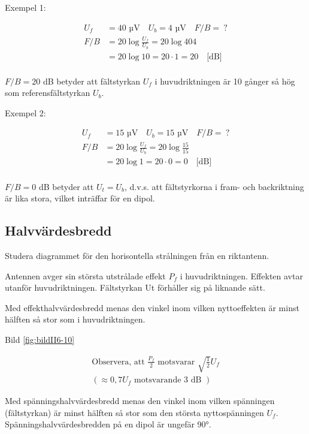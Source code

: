 Exempel 1:

\begin{align*}
  U_f &= 40 \text{ µV} \quad U_b = 4\text{ µV} \quad F/B =\ ? \\
  F/B &= 20 \log\frac{U_f}{U_b} = 20 \log{40}{4} \\
  &= 20 \log 10 = 20 \cdot 1 = 20 \quad \text{[dB]} \\
\end{align*}

\(F/B = 20\) dB betyder att fältstyrkan \(U_f\) i huvudriktningen är
10 gånger så hög som referensfältstyrkan \(U_b\).

Exempel 2:

\begin{align*}
  U_f &= 15 \text{ µV} \quad U_b = 15\text{ µV} \quad F/B =\ ? \\
  F/B &= 20 \log\frac{U_f}{U_b} = 20 \log\frac{15}{15} \\
  &= 20 \log 1 = 20 \cdot 0 = 0 \quad \text{[dB]} \\
\end{align*}

\(F/B = 0\) dB betyder att \(U_t = U_b\), d.v.s. att fältstyrkorna i
fram- och backriktning är lika stora, vilket inträffar för en dipol.

\subsection{Halvvärdesbredd}

Studera diagrammet för den horisontella strålningen från en
riktantenn.

Antennen avger sin största utstrålade effekt \(P_f\) i
huvudriktningen.  Effekten avtar utanför huvudriktningen.  Fältstyrkan
Ut förhåller sig på liknande sätt.

Med effekthalvvärdesbredd menas den vinkel inom vilken nyttoeffekten
är minst hälften så stor som i huvudriktningen.

Bild \ref{fig:bildII6-10}

\begin{gather*}
  \text{Observera, att } \frac{P_f}{2} \text{ motsvarar }
  \sqrt{\frac{1}{2}}U_f \\
  ( \approx 0,7 U_f \text{ motsvarande 3 dB })
\end{gather*}

Med spänningshalvvärdesbredd menas den vinkel inom vilken spänningen
(fältstyrkan) är minst hälften så stor som den största nyttospänningen
\(U_f\). Spänningshalvvärdesbredden på en dipol är ungefär 90°.

